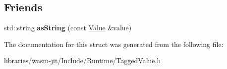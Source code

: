 \subsection*{Friends}
\begin{DoxyCompactItemize}
\item 
\mbox{\label{struct_runtime_1_1_value_ad0bd5622d0a548f85c4750c5f74de124}} 
std\+::string {\bfseries as\+String} (const \mbox{\hyperlink{struct_runtime_1_1_value}{Value}} \&value)
\end{DoxyCompactItemize}


The documentation for this struct was generated from the following file\+:\begin{DoxyCompactItemize}
\item 
libraries/wasm-\/jit/\+Include/\+Runtime/Tagged\+Value.\+h\end{DoxyCompactItemize}
